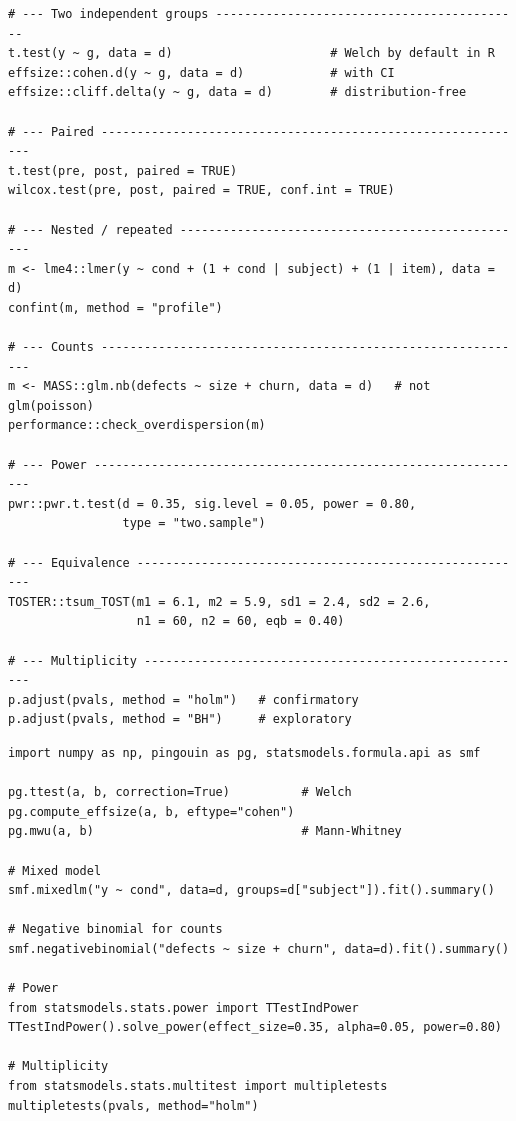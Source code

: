 \begin{lstlisting}[language=Rlang, caption={\texttt{code/appB\_tests.R} --- the
common cases, with the reporting each needs.}]
# --- Two independent groups -------------------------------------------
t.test(y ~ g, data = d)                      # Welch by default in R
effsize::cohen.d(y ~ g, data = d)            # with CI
effsize::cliff.delta(y ~ g, data = d)        # distribution-free

# --- Paired ------------------------------------------------------------
t.test(pre, post, paired = TRUE)
wilcox.test(pre, post, paired = TRUE, conf.int = TRUE)

# --- Nested / repeated -------------------------------------------------
m <- lme4::lmer(y ~ cond + (1 + cond | subject) + (1 | item), data = d)
confint(m, method = "profile")

# --- Counts ------------------------------------------------------------
m <- MASS::glm.nb(defects ~ size + churn, data = d)   # not glm(poisson)
performance::check_overdispersion(m)

# --- Power -------------------------------------------------------------
pwr::pwr.t.test(d = 0.35, sig.level = 0.05, power = 0.80,
                type = "two.sample")

# --- Equivalence -------------------------------------------------------
TOSTER::tsum_TOST(m1 = 6.1, m2 = 5.9, sd1 = 2.4, sd2 = 2.6,
                  n1 = 60, n2 = 60, eqb = 0.40)

# --- Multiplicity ------------------------------------------------------
p.adjust(pvals, method = "holm")   # confirmatory
p.adjust(pvals, method = "BH")     # exploratory
\end{lstlisting}

\begin{lstlisting}[language=PythonARM, caption={\texttt{code/appB\_tests.py} --- the
same cases in Python, for those who prefer it.}]
import numpy as np, pingouin as pg, statsmodels.formula.api as smf

pg.ttest(a, b, correction=True)          # Welch
pg.compute_effsize(a, b, eftype="cohen")
pg.mwu(a, b)                             # Mann-Whitney

# Mixed model
smf.mixedlm("y ~ cond", data=d, groups=d["subject"]).fit().summary()

# Negative binomial for counts
smf.negativebinomial("defects ~ size + churn", data=d).fit().summary()

# Power
from statsmodels.stats.power import TTestIndPower
TTestIndPower().solve_power(effect_size=0.35, alpha=0.05, power=0.80)

# Multiplicity
from statsmodels.stats.multitest import multipletests
multipletests(pvals, method="holm")
\end{lstlisting}

